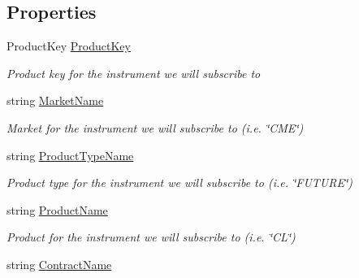 \subsection*{Properties}
\begin{DoxyCompactItemize}
\item 
Product\-Key \hyperlink{class_e_z_a_p_i_1_1_containers_1_1_instrument_descriptor_ae4bd32949b19a10f0ceefb9ffa41f640}{Product\-Key}
\begin{DoxyCompactList}\small\item\em Product key for the instrument we will subscribe to \end{DoxyCompactList}\item 
string \hyperlink{class_e_z_a_p_i_1_1_containers_1_1_instrument_descriptor_a8def1a58d25def5cfc159311fa52a048}{Market\-Name}
\begin{DoxyCompactList}\small\item\em Market for the instrument we will subscribe to (i.\-e. \char`\"{}\-C\-M\-E\char`\"{}) \end{DoxyCompactList}\item 
string \hyperlink{class_e_z_a_p_i_1_1_containers_1_1_instrument_descriptor_a87f1888c91572713fe1860da8e2ffca5}{Product\-Type\-Name}
\begin{DoxyCompactList}\small\item\em Product type for the instrument we will subscribe to (i.\-e. \char`\"{}\-F\-U\-T\-U\-R\-E\char`\"{}) \end{DoxyCompactList}\item 
string \hyperlink{class_e_z_a_p_i_1_1_containers_1_1_instrument_descriptor_ab5504fdb91ebedf1fb17141d350aef5e}{Product\-Name}
\begin{DoxyCompactList}\small\item\em Product for the instrument we will subscribe to (i.\-e. \char`\"{}\-C\-L\char`\"{}) \end{DoxyCompactList}\item 
string \hyperlink{class_e_z_a_p_i_1_1_containers_1_1_instrument_descriptor_a542114edf9499c5da72c14e10d3e95c3}{Contract\-Name}

\end{DoxyCompactItemize}
